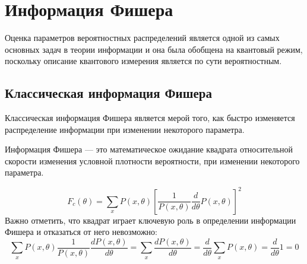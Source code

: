 \section{Информация Фишера}

Оценка параметров вероятностных распределений является одной из самых основных задач в теории информации 
и она была обобщена на квантовый режим\cite{Helstrom1976, Holevo1982}, поскольку описание квантового измерения является по сути вероятностным. 

\subsection{Классическая информация Фишера}
Классическая информация Фишера является мерой того, 
как быстро изменяется распределение информации при изменении некоторого параметра.

\begin{definition}\label{def:fisher-information}
 Информация Фишера --- это математическое ожидание квадрата относительной скорости изменения условной плотности вероятности,
 при изменении некоторого параметра. 
\end{definition}
%
\begin{equation}\label{eq:fisher-information}
  F_c({\theta})= 
      \sum_x{{P}(x,\theta)}
          \left[\frac{1}{P(x,\theta)}
     \frac{d}{d\theta}
  {P(x,\theta)}\right]^2
\end{equation}
%
Важно отметить, 
что квадрат играет ключевую роль в определении информации Фишера 
и отказаться от него невозможно: 
%
\begin{equation}
    \label{eq:2}
        \sum_x{{P}(x,\theta)}
            \frac{1}{P(x,\theta)}
                \frac{dP(x,\theta)}{d\theta} =
                    \sum_x\frac{{dP}(x,\theta)}{d\theta} = 
                \frac{d}{d\theta}\sum_x{{P}(x,\theta)} =
            \frac{d}{d\theta}1 = 
            0
\end{equation}

